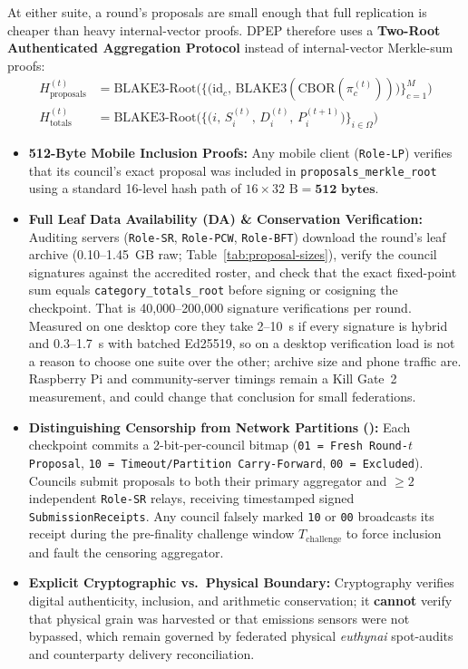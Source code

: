 \documentclass[10pt,twoside,openany]{book}
\theoremstyle{dpepstyle}
\begin{document}
At either suite, a round's proposals are small enough that full replication is cheaper than heavy internal-vector proofs. DPEP therefore uses a \textbf{Two-Root Authenticated Aggregation Protocol} instead of internal-vector Merkle-sum proofs:
\begin{align}
  H_{\text{proposals}}^{(t)} &= \text{BLAKE3-Root}\Big(\big\{\big(\text{id}_c, \, \text{BLAKE3}(\text{CBOR}(\pi_c^{(t)}))\big)\big\}_{c=1}^M\Big) \\
  H_{\text{totals}}^{(t)} &= \text{BLAKE3-Root}\Big(\big\{\big(i, \, S_i^{(t)}, \, D_i^{(t)}, \, P_i^{(t+1)}\big)\big\}_{i \in \Omega}\Big)
\end{align}
\begin{itemize}[leftmargin=1.6em,itemsep=2pt]
  \item \textbf{512-Byte Mobile Inclusion Proofs:} Any mobile client (\texttt{Role-LP}) verifies that its council's exact proposal was included in \texttt{proposals\_merkle\_root} using a standard 16-level hash path of $16 \times 32\text{ B} = \mathbf{512\text{ bytes}}$.
  \item \textbf{Full Leaf Data Availability (DA) \& Conservation Verification:} Auditing servers (\texttt{Role-SR}, \texttt{Role-PCW}, \texttt{Role-BFT}) download the round's leaf archive (0.10--1.45~GB raw; Table~\ref{tab:proposal-sizes}), verify the council signatures against the accredited roster, and check that the exact fixed-point sum equals \texttt{category\_totals\_root} before signing or cosigning the checkpoint. That is 40,000--200,000 signature verifications per round. Measured on one desktop core they take 2--10~s if every signature is hybrid and 0.3--1.7~s with batched Ed25519, so on a desktop verification load is not a reason to choose one suite over the other; archive size and phone traffic are. Raspberry Pi and community-server timings remain a Kill Gate~2 measurement, and could change that conclusion for small federations.
  \item \textbf{Distinguishing Censorship from Network Partitions ():} Each checkpoint commits a 2-bit-per-council bitmap (\texttt{01 = Fresh Round-$t$ Proposal}, \texttt{10 = Timeout/Partition Carry-Forward}, \texttt{00 = Excluded}). Councils submit proposals to both their primary aggregator and $\ge 2$ independent \texttt{Role-SR} relays, receiving timestamped signed \texttt{SubmissionReceipts}. Any council falsely marked \texttt{10} or \texttt{00} broadcasts its receipt during the pre-finality challenge window $T_{\text{challenge}}$ to force inclusion and fault the censoring aggregator.
  \item \textbf{Explicit Cryptographic vs.\ Physical Boundary:} Cryptography verifies digital authenticity, inclusion, and arithmetic conservation; it \textbf{cannot} verify that physical grain was harvested or that emissions sensors were not bypassed, which remain governed by federated physical \emph{euthynai} spot-audits and counterparty delivery reconciliation.
\end{itemize}
\end{document}
